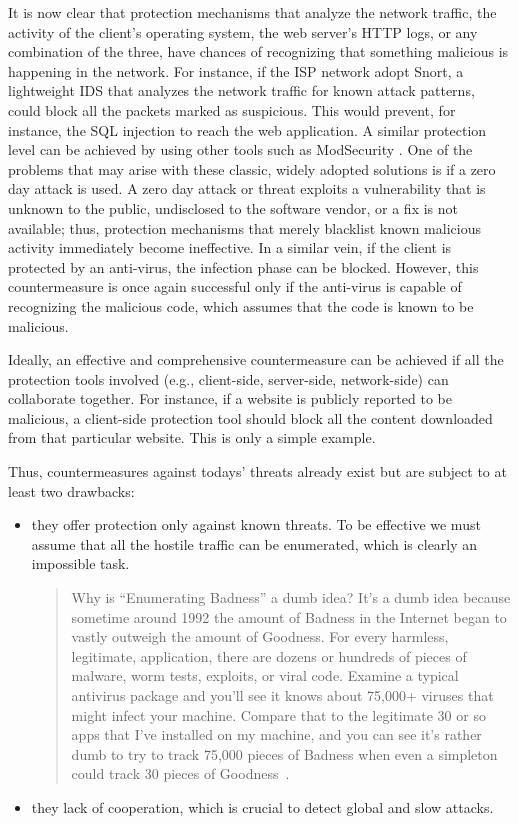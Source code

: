 It is now clear that protection mechanisms that analyze the network traffic, the activity of the client's operating system, the web server's \ac{HTTP} logs, or any combination of the three, have chances of recognizing that something malicious is happening in the network. For instance, if the \ac{ISP} network adopt \textsf{Snort}, a lightweight \ac{IDS} that analyzes the network traffic for known attack patterns, could block all the packets marked as suspicious. This would prevent, for instance, the \ac{SQL} injection to reach the web application. A similar protection level can be achieved by using other tools such as \textsf{ModSecurity} \citep{ristic:mod_security}. One of the problems that may arise with these classic, widely adopted solutions is if a zero day attack is used. A zero day attack or threat exploits a vulnerability that is unknown to the public, undisclosed to the software vendor, or a fix is not available; thus, protection mechanisms that merely blacklist known malicious activity immediately become ineffective. In a similar vein, if the client is protected by an anti-virus, the infection phase can be blocked. However, this countermeasure is once again successful only if the anti-virus is capable of recognizing the malicious code, which assumes that the code is known to be malicious.

Ideally, an effective and comprehensive countermeasure can be achieved if all the protection tools involved (e.g., client-side, server-side, network-side) can collaborate together. For instance, if a website is publicly reported to be malicious, a client-side protection tool should block all the content downloaded from that particular website. This is only a simple example.

Thus, countermeasures against todays' threats already exist but are subject to at least two drawbacks:

\begin{itemize}
\item they offer protection only against known threats. To be effective we must assume that all the hostile traffic can be enumerated, which is clearly an impossible task.

\begin{quotation}
Why is ``Enumerating Badness'' a dumb idea? It's a dumb idea because sometime around 1992 the amount of Badness in the Internet began to vastly outweigh the amount of Goodness. For every harmless, legitimate, application, there are dozens or hundreds of pieces of malware, worm tests, exploits, or viral code. Examine a typical antivirus package and you'll see it knows about 75,000+ viruses that might infect your machine. Compare that to the legitimate 30 or so apps that I've installed on my machine, and you can see it's rather dumb to try to track 75,000 pieces of Badness when even a simpleton could track 30 pieces of Goodness~\citep{ranum-myths}.
\end{quotation}

\item they lack of cooperation, which is crucial to detect global and slow attacks.
\end{itemize}

